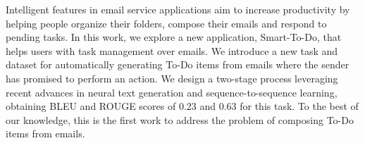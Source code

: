 Intelligent features in email service applications aim to increase productivity by helping people organize their folders, compose their emails and respond to pending tasks. In this work, we explore a new application, Smart-To-Do, that helps users with task management over emails. We introduce a new task and dataset for automatically generating To-Do items from emails where the sender has promised to perform an action. We design a two-stage process leveraging recent advances in neural text generation and sequence-to-sequence learning, obtaining BLEU and ROUGE scores of 0.23 and 0.63 for this task. To the best of our knowledge, this is the first work to address the problem of composing To-Do items from emails.
